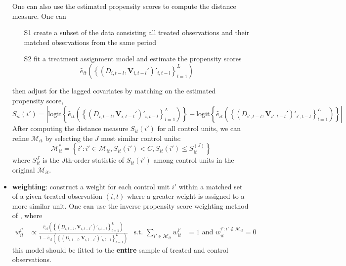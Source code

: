 \documentclass[twoside]{article}
\begin{document}
\begin{itemize}
    One can also use the estimated propensity scores to compute the distance measure. One can 
    \begin{itemize}
        \item[S1] create a subset of the data consisting all treated observations and their matched observations from the same period
        \item[S2] fit a treatment assignment model and estimate the propensity scores $$\hat{e}_{it}\left(\left\{\left(D_{i,t-l},\mathbf{V}_{i,t-l}'\right)'_{i,t-l}\right\}^L_{l=1}\right)$$ 
    \end{itemize}
    then adjust for the lagged covariates by matching on the estimated propensity score,
    \begin{equation*}
        S_{it}\left(i'\right) = \left\vert \mathrm{logit} \left\{ \hat{e}_{it}\left(\left\{\left(D_{i,t-l},\mathbf{V}_{i,t-l}'\right)'_{i,t-l}\right\}^L_{l=1}\right) \right\} -\mathrm{logit} \left\{ \hat{e}_{it}\left(\left\{\left(D_{i',t-l},\mathbf{V}_{i',t-l}'\right)'_{i',t-l}\right\}^L_{l=1}\right) \right\} \right\vert 
    \end{equation*}
    After computing the distance measure $S_{it}(i')$ for all control units, we can refine $\mathcal{M}_{it}$ by selecting the $J$ most similar control units:
    \begin{equation*}
        \mathcal{M}^*_{it} = \left\{ i':i'\in\mathcal{M}_{it},S_{it}(i')<C,S_{it}(i')\leq S^{(J)}_{it} \right\}
    \end{equation*}
    where $S^{J}_{it}$ is the $J$th-order statistic of $S_{it}(i')$ among control units in the original $\mathcal{M}_{it}$.
    \item \textbf{weighting}: construct a weight for each control unit $i'$ within a matched set of a given treated observation $(i,t)$ where a greater weight is assigned to a more similar unit.
    One can use the inverse propensity score weighting method of \citet{hirano2003efficient}, where 
    \begin{align*}
        w^{i'}_{it} &\varpropto \frac{ \hat{e}_{it}\left(\left\{\left(D_{i,t-l},\mathbf{V}_{i,t-l}'\right)'_{i,t-l}\right\}^L_{l=1}\right) }{ 1- \hat{e}_{it}\left(\left\{\left(D_{i,t-l},\mathbf{V}_{i,t-l}'\right)'_{i,t-l}\right\}^L_{l=1}\right) } & \text{s.t. } \sum_{i'\in\mathcal{M}_{it}} w^{i'}_{it} &=1 \text{ and } w^{i':i'\not\in \mathcal{M}_{it}}_{it}=0
    \end{align*}
    this model should be fitted to the \textbf{entire} sample of treated and control observations.
\end{itemize}
\end{document}
